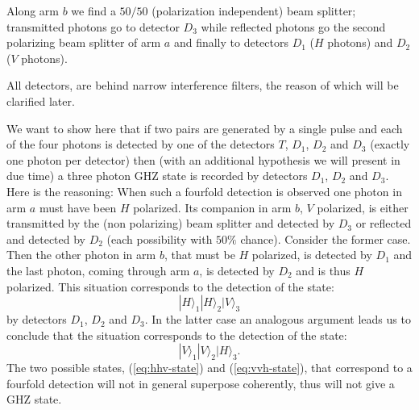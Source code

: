 Along arm $b$ we find a $50/50$ (polarization independent) beam splitter; transmitted photons go to detector $D_3$ while reflected photons go the second polarizing beam splitter of arm $a$ and finally to detectors $D_1$ ($H$ photons) and $D_2$ ($V$ photons).

All detectors, are behind narrow interference filters, the reason of which will be clarified later.

We want to show here that if two pairs are generated by a single pulse and each of the four photons is detected by one of the detectors $T$, $D_1$, $D_2$ and $D_3$ (exactly one photon per detector) then (with an additional hypothesis we will present in due time) a three photon GHZ state is recorded by detectors $D_1$, $D_2$ and $D_3$. Here is the reasoning: When such a fourfold detection is observed one photon in arm $a$ must have been $H$ polarized. Its companion in arm $b$, $V$ polarized, is either transmitted by the (non polarizing) beam splitter and detected by $D_3$ or reflected and detected by $D_2$ (each possibility with $50 \%$ chance). Consider the former case. Then the other photon in arm $b$, that must be $H$ polarized, is detected by $D_1$ and the last photon, coming through arm $a$, is detected by $D_2$ and is thus $H$ polarized. This situation corresponds to the detection of the state:
\begin{equation}
  |H\rangle_1 |H\rangle_2 |V\rangle_3
  \label{eq:hhv-state}
\end{equation}
by detectors $D_1$, $D_2$ and $D_3$. In the latter case an analogous argument leads us to conclude that the situation corresponds to the detection of the state:
\begin{equation}
  |V\rangle_1 |V\rangle_2 |H\rangle_3.
  \label{eq:vvh-state}
\end{equation}
The two possible states, (\ref{eq:hhv-state}) and (\ref{eq:vvh-state}), that correspond to a fourfold detection will not in general superpose coherently, thus will not give a GHZ state.

